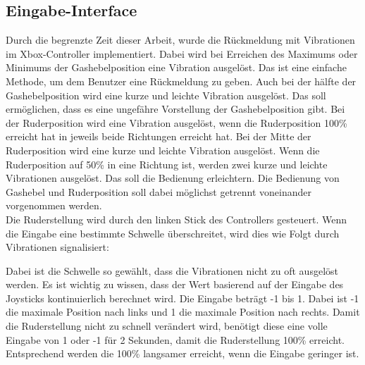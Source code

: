 \subsection{Eingabe-Interface}
Durch die begrenzte Zeit dieser Arbeit, wurde die Rückmeldung mit Vibrationen im Xbox-Controller implementiert.
Dabei wird bei Erreichen des Maximums oder Minimums der Gashebelposition eine Vibration ausgelöst. Das ist eine einfache
Methode, um dem Benutzer eine Rückmeldung zu geben. Auch bei der hälfte der Gashebelposition wird eine kurze und leichte 
Vibration ausgelöst. Das soll ermöglichen, dass es eine ungefähre Vorstellung der Gashebelposition gibt.
Bei der Ruderposition wird eine Vibration ausgelöst, wenn die Ruderposition 100\% erreicht hat in jeweils beide Richtungen
erreicht hat. Bei der Mitte der Ruderposition wird eine kurze und leichte Vibration ausgelöst. Wenn die 
Ruderposition auf 50\% in eine Richtung ist, werden zwei kurze und leichte Vibrationen ausgelöst. Das soll die Bedienung
erleichtern. Die Bedienung von Gashebel und Ruderposition soll dabei möglichst getrennt voneinander vorgenommen werden.
\\
Die Ruderstellung wird durch den linken Stick des Controllers gesteuert. Wenn die Eingabe eine bestimmte Schwelle überschreitet,
wird dies wie Folgt durch Vibrationen signalisiert: 
\begin{figure}[H]
    \centering
\end{figure}

Dabei ist die Schwelle so gewählt, dass die Vibrationen nicht zu oft ausgelöst werden. 
Es ist wichtig zu wissen, dass der Wert basierend auf der Eingabe des Joysticks kontinuierlich berechnet wird.
Die Eingabe beträgt -1 bis 1. Dabei ist -1 die maximale Position nach links und 1 die maximale Position nach rechts.
Damit die Ruderstellung nicht zu schnell verändert wird, benötigt diese eine volle Eingabe von 1 oder -1 für 2 Sekunden,
damit die Ruderstellung 100\% erreicht. Entsprechend werden die 100\% langsamer erreicht, wenn die Eingabe geringer
ist.


